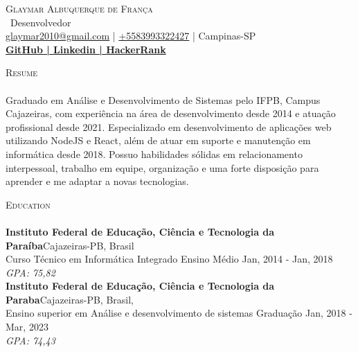\documentclass[a4paper]{article}
\newcommand{\lineunder} {
    \vspace*{-8pt} \\
    \hspace*{-18pt} \hrulefill \\
}
\newcommand{\header} [1] {
    {\hspace*{-18pt}\vspace*{6pt} \textsc{#1}}
    \vspace*{-6pt} \lineunder
}
\begin{document}
    \vspace*{-40pt}

    

%
%
  \vspace*{-2pt}
  \begin{center}
    {\Huge \scshape {Glaymar Albuquerque de França}}\\
    \vspace*{2pt}
    \ {Desenvolvedor}\\
    \vspace*{2pt}
    \href{mailto:glaymar2010@gmail.com}{glaymar2010@gmail.com} | \href{tel:+5583993322427}{+5583993322427} | Campinas-SP\\
    \vspace*{2pt}
    \textbf{\href{https://github.com/bodescorp}{GitHub | }}\textbf{\href{https://www.linkedin.com/in/glaymar-albuquerque-de-fran\%C3\%A7a/}{Linkedin | }}\textbf{\href{https://www.hackerrank.com/profile/Glaymar}{HackerRank}}\\
  \end{center}

 \header{Resume}
    \vspace{2mm}
           Graduado em Análise e Desenvolvimento de Sistemas pelo IFPB, Campus Cajazeiras, com experiência na área de desenvolvimento desde 2014 e atuação profissional desde 2021. Especializado em desenvolvimento de aplicações web utilizando NodeJS e React, além de atuar em suporte e manutenção em informática desde 2018. Possuo habilidades sólidas em relacionamento interpessoal, trabalho em equipe, organização e uma forte disposição para aprender e me adaptar a novas tecnologias.
    \vspace{2mm}


      \header{Education}
      \vspace{2mm}
      \textbf{Instituto Federal de Educação, Ciência e Tecnologia da Paraíba}\hfill Cajazeiras-PB, Brasil\\
Curso Técnico em Informática Integrado Ensino Médio \hfill Jan, 2014 - Jan, 2018\\
{\sl GPA: 75,82}\\
\vspace{2mm}
      \textbf{Instituto Federal de Educação, Ciência e Tecnologia da Paraba}\hfill Cajazeiras-PB, Brasil,\\
Ensino superior em Análise e desenvolvimento de sistemas Graduação \hfill Jan, 2018 - Mar, 2023\\
{\sl GPA: 74,43}\\
\vspace{2mm}
\end{document}
